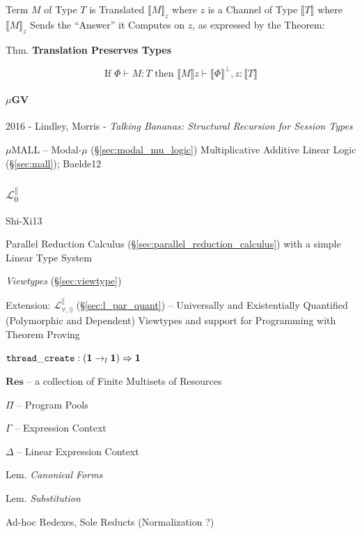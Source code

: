 Term $M$ of Type $T$ is Translated $\llbracket M \rrbracket_z$ where
$z$ is a Channel of Type $\llbracket T \rrbracket$ where $\llbracket M
\rrbracket_z$ Sends the ``Answer'' it Computes on $z$, as expressed by
the Theorem:

Thm. \textbf{Translation Preserves Types}

\[
  \text{If } \Phi \vdash M : T \text{ then }
  \llbracket M \rrbracket z \vdash \llbracket \Phi \rrbracket^\bot,
  z : \llbracket T \rrbracket
\]



\paragraph{$\mu$GV}\label{sec:mu_gv}\hfill

2016 - Lindley, Morris - \emph{Talking Bananas: Structural Recursion for Session
Types}

$\mu$MALL -- Modal-$\mu$ (\S\ref{sec:modal_mu_logic}) Multiplicative Additive
Linear Logic (\S\ref{sec:mall}); Baelde12



\subsubsection{$\mathcal{L}^\parallel_0$}\label{sec:l_par_zero}

Shi-Xi13

Parallel Reduction Calculus (\S\ref{sec:parallel_reduction_calculus})
with a simple Linear Type System

\emph{Viewtypes} (\S\ref{sec:viewtype})

\fist Extension: $\mathcal{L}^\parallel_{\forall,\exists}$
(\S\ref{sec:l_par_quant}) -- Universally and Existentially Quantified
(Polymorphic and Dependent) Viewtypes and support for Programming with
Theorem Proving

$\mathtt{thread\_create} : (\mathbf{1} \rightarrow_l \mathbf{1})
\Rightarrow \mathbf{1}$

$\mathbf{Res}$ -- a collection of Finite Multisets of Resources

$\Pi$ -- Program Pools

$\Gamma$ -- Expression Context

$\Delta$ -- Linear Expression Context

Lem. \emph{Canonical Forms}

Lem. \emph{Substitution}

Ad-hoc Redexes, Sole Reducts (Normalization ?)

